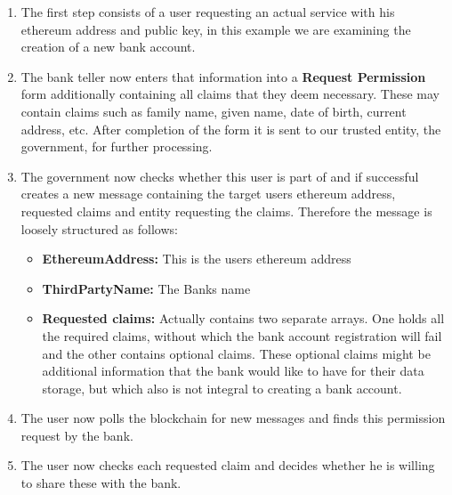 \begin{enumerate}
\item \label{permission_request_item_one}
The first step consists of a user requesting an actual service with his ethereum address and public key, in this example we are examining the creation of a new bank account.
\begin{comment}
"An" goes before all words that begin with vowels:
An egg
With two exceptions:
When "u" makes the same sound as the "y" in you, or "o" makes the same sound as "w" in won, then "a" is used:
a union
a united front
a unicorn
a used napkin
a U.S. ship
a one-legged man
https://english.stackexchange.com/questions/105116/is-it-a-user-or-an-user
\end{comment}
\item \label{permission_request_item_two}
The bank teller now enters that information into a \textbf{Request Permission} form additionally containing all claims that they deem necessary. These may contain claims such as
family name, given name, date of birth, current address, etc. After completion of the form it is sent to our trusted entity, the government, for further processing.
\item \label{permission_request_item_three}
The government now checks whether this user is part of \projectName{} and if successful creates a new message containing the target users ethereum address, requested claims and entity requesting the claims.
Therefore the message is loosely structured as follows:
\begin{itemize}
\item \textbf{EthereumAddress:} This is the users ethereum address
\item \textbf{ThirdPartyName:} The Banks name
\item \textbf{Requested claims:} Actually contains two separate arrays.
One holds all the required claims, without which the bank account registration will fail and the other contains optional claims.
These optional claims might be additional information that the bank would like to have for their data storage, but which also is not integral to creating a bank account.
\end{itemize}
\item \label{permission_request_item_four}
The user now polls the blockchain for new messages and finds this permission request by the bank.
\item \label{permission_request_item_five}
The user now checks each requested claim and decides whether he is willing to share these with the bank.

\end{enumerate}
